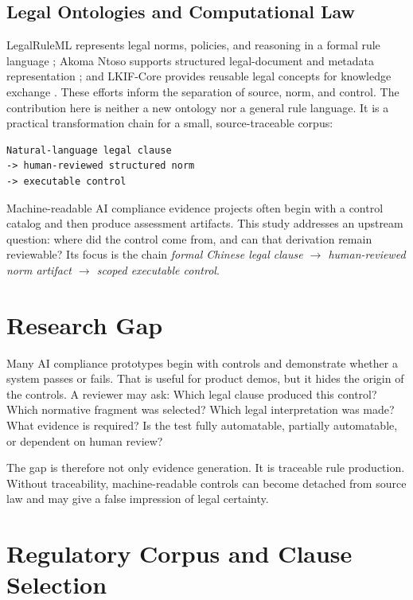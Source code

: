 \documentclass[10pt,journal]{IEEEtran}
\begin{document}
\subsection{Legal Ontologies and Computational Law}

LegalRuleML represents legal norms, policies, and reasoning in a formal rule language \cite{legalRuleMl2021}; Akoma Ntoso supports structured legal-document and metadata representation \cite{akomaNtoso2018}; and LKIF-Core provides reusable legal concepts for knowledge exchange \cite{breuker2007lkif}. These efforts inform the separation of source, norm, and control. The contribution here is neither a new ontology nor a general rule language. It is a practical transformation chain for a small, source-traceable corpus:

\begin{lstlisting}
Natural-language legal clause
-> human-reviewed structured norm
-> executable control
\end{lstlisting}

Machine-readable AI compliance evidence projects often begin with a control catalog and then produce assessment artifacts. This study addresses an upstream question: where did the control come from, and can that derivation remain reviewable? Its focus is the chain \emph{formal Chinese legal clause $\rightarrow$ human-reviewed norm artifact $\rightarrow$ scoped executable control}.

\section{Research Gap}

Many AI compliance prototypes begin with controls and demonstrate whether a system passes or fails. That is useful for product demos, but it hides the origin of the controls. A reviewer may ask: Which legal clause produced this control? Which normative fragment was selected? Which legal interpretation was made? What evidence is required? Is the test fully automatable, partially automatable, or dependent on human review?

The gap is therefore not only evidence generation. It is traceable rule production. Without traceability, machine-readable controls can become detached from source law and may give a false impression of legal certainty.

\section{Regulatory Corpus and Clause Selection}
\end{document}
